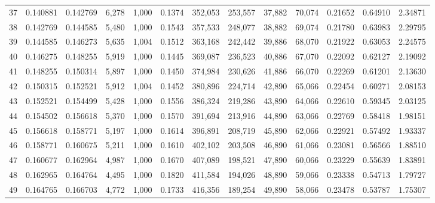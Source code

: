 \begin{tabular}{rrrrrrrrrrrrr}
37  &  0.140881 &  0.142769 &   6,278 &  1,000 &                                     0.1374 &  352,053 &  253,557 &   37,882 &   70,074 &  0.21652 &  0.64910 &  2.34871 \\
38  &  0.142769 &  0.144585 &   5,480 &  1,000 &                                     0.1543 &  357,533 &  248,077 &   38,882 &   69,074 &  0.21780 &  0.63983 &  2.29795 \\
39  &  0.144585 &  0.146273 &   5,635 &  1,004 &                                     0.1512 &  363,168 &  242,442 &   39,886 &   68,070 &  0.21922 &  0.63053 &  2.24575 \\
40  &  0.146275 &  0.148255 &   5,919 &  1,000 &                                     0.1445 &  369,087 &  236,523 &   40,886 &   67,070 &  0.22092 &  0.62127 &  2.19092 \\
41  &  0.148255 &  0.150314 &   5,897 &  1,000 &                                     0.1450 &  374,984 &  230,626 &   41,886 &   66,070 &  0.22269 &  0.61201 &  2.13630 \\
42  &  0.150315 &  0.152521 &   5,912 &  1,004 &                                     0.1452 &  380,896 &  224,714 &   42,890 &   65,066 &  0.22454 &  0.60271 &  2.08153 \\
43  &  0.152521 &  0.154499 &   5,428 &  1,000 &                                     0.1556 &  386,324 &  219,286 &   43,890 &   64,066 &  0.22610 &  0.59345 &  2.03125 \\
44  &  0.154502 &  0.156618 &   5,370 &  1,000 &                                     0.1570 &  391,694 &  213,916 &   44,890 &   63,066 &  0.22769 &  0.58418 &  1.98151 \\
45  &  0.156618 &  0.158771 &   5,197 &  1,000 &                                     0.1614 &  396,891 &  208,719 &   45,890 &   62,066 &  0.22921 &  0.57492 &  1.93337 \\
46  &  0.158771 &  0.160675 &   5,211 &  1,000 &                                     0.1610 &  402,102 &  203,508 &   46,890 &   61,066 &  0.23081 &  0.56566 &  1.88510 \\
47  &  0.160677 &  0.162964 &   4,987 &  1,000 &                                     0.1670 &  407,089 &  198,521 &   47,890 &   60,066 &  0.23229 &  0.55639 &  1.83891 \\
48  &  0.162965 &  0.164764 &   4,495 &  1,000 &                                     0.1820 &  411,584 &  194,026 &   48,890 &   59,066 &  0.23338 &  0.54713 &  1.79727 \\
49  &  0.164765 &  0.166703 &   4,772 &  1,000 &                                     0.1733 &  416,356 &  189,254 &   49,890 &   58,066 &  0.23478 &  0.53787 &  1.75307 \\

\end{tabular}
